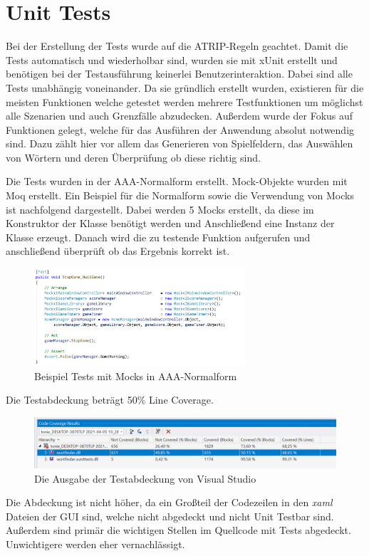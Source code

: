 \chapter{Unit Tests}

Bei der Erstellung der Tests wurde auf die ATRIP-Regeln geachtet. Damit die Tests automatisch und wiederholbar sind, wurden sie mit xUnit erstellt und benötigen bei der Testausführung keinerlei Benutzerinteraktion. Dabei sind alle Tests unabhängig voneinander. Da sie gründlich erstellt wurden, existieren für die meisten Funktionen welche getestet werden mehrere Testfunktionen um möglichst alle Szenarien und auch Grenzfälle abzudecken. Außerdem wurde der Fokus auf Funktionen gelegt, welche für das Ausführen der Anwendung absolut notwendig sind. Dazu zählt hier vor allem das Generieren von Spielfeldern, das Auswählen von Wörtern und deren Überprüfung ob diese richtig sind.  


Die Tests wurden in der AAA-Normalform erstellt. Mock-Objekte wurden mit Moq erstellt. Ein Beispiel für die Normalform sowie die Verwendung von Mocks ist nachfolgend dargestellt. Dabei werden 5 Mocks erstellt, da diese im Konstruktor der Klasse benötigt werden und Anschließend eine Instanz der Klasse erzeugt. Danach wird die zu testende Funktion aufgerufen und anschließend überprüft ob das Ergebnis korrekt ist.

\begin{figure}[htb]
\centering
\includegraphics[width=0.7\textwidth]{Bilder/UnitTest.PNG}
\caption{\label{Abb:UnitTest}Beispiel Tests mit Mocks in AAA-Normalform}
\end{figure}



Die Testabdeckung beträgt 50\% Line Coverage.

\begin{figure}[htb]
\centering
\includegraphics[width=1.0\textwidth]{Bilder/Testabdeckung.PNG}
\caption{\label{Abb:Testabdeckung}Die Ausgabe der Testabdeckung von Visual Studio}
\end{figure}

Die Abdeckung ist nicht höher, da ein Großteil der Codezeilen in den \textit{xaml} Dateien der GUI sind, welche nicht abgedeckt und nicht Unit Testbar sind. Außerdem sind primär die wichtigen Stellen im Quellcode mit Tests abgedeckt. Unwichtigere werden eher vernachlässigt.

\endinput